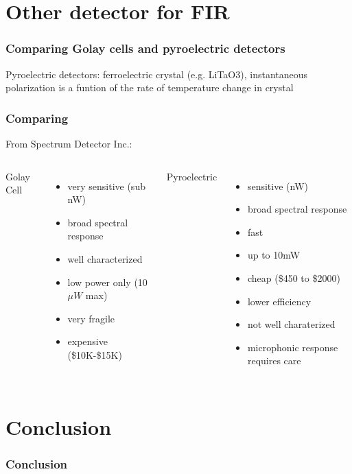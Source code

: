 \documentclass[14pt]{beamer}
\begin{document}
\section{Other detector for FIR}
\begin{frame}
\frametitle{Comparing Golay cells and pyroelectric detectors}
Pyroelectric detectors: ferroelectric crystal (e.g. LiTaO3), instantaneous polarization is a funtion of the rate of temperature change in crystal

\end{frame}

\begin{frame}
\frametitle{Comparing}
From Spectrum Detector Inc.:\\

\begin{columns}
Golay Cell
\begin{itemize}
\item very sensitive (sub nW)
\item broad spectral response
\item well characterized
\item low power only (10$\mu W$ max)
\item very fragile
\item expensive (\$10K-\$15K)
\end{itemize}
Pyroelectric
\begin{itemize}
\item sensitive (nW)
\item broad spectral response
\item fast
\item up to 10mW
\item cheap (\$450 to \$2000)
\item lower efficiency
\item not well charaterized
\item microphonic response requires care
\end{itemize}
\end{columns}
\end{frame}

\section{Conclusion}
\begin{frame}
\frametitle{Conclusion}

\end{frame}

\appendix
\end{document}
